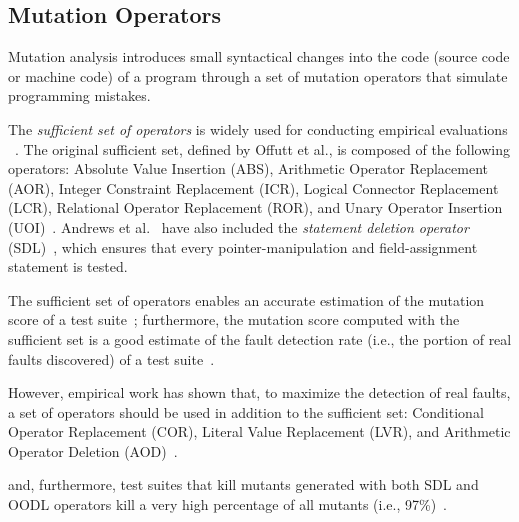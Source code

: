 \subsection{Mutation Operators}
\label{sec:related:operators}

%


Mutation analysis introduces small syntactical changes into the code (source code or machine code) of a program through a set of mutation operators that simulate programming mistakes.



The  \emph{sufficient set of operators} is widely used for conducting empirical evaluations ~\cite{offutt1996experimental,rothermel1996experimental,andrews2005mutation,kintis2017detecting}.
The original sufficient set, defined by Offutt et al., is composed of the following operators: Absolute Value Insertion (ABS), Arithmetic Operator Replacement (AOR), Integer Constraint Replacement (ICR), Logical Connector Replacement (LCR), Relational Operator Replacement (ROR), and Unary Operator Insertion (UOI)~\cite{offutt1996experimental}.
Andrews et al.~\cite{andrews2005mutation} have also included the
\emph{statement deletion operator} (SDL)~\cite{delamaro2014designing}, which ensures that every pointer-manipulation and field-assignment statement is tested.

The sufficient set of operators enables an accurate estimation of the mutation score of a test suite~\cite{siami2008sufficient}; furthermore, the mutation score computed with the sufficient set is a good estimate of the fault detection rate (i.e., the portion of real faults discovered) of a test suite~\cite{andrews2005mutation,Just:RealFaults:2014}.

However, empirical work has shown that, to maximize the detection of real faults, a set of operators should be used in addition to the sufficient set: Conditional Operator Replacement (COR),
Literal Value Replacement (LVR), and Arithmetic Operator Deletion (AOD)~\cite{Kintis2018}.


\cite{delamaro2014designing,delamaro2014experimental} and, furthermore,
test suites that kill mutants generated with both SDL and OODL operators kill a very high percentage of all mutants (i.e., 97\%)~\cite{delamaro2014experimental}.

